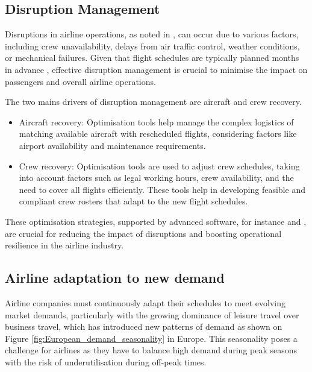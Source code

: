 \subsection{Disruption Management} %
\label{sub:disruption management}

Disruptions in airline operations, as noted in \cite{disruption_management}, can occur due to various factors, including crew unavailability, delays from air traffic control, weather conditions, or mechanical failures. Given that flight schedules are typically planned months in advance \cite{flight_scheduling}, effective disruption management is crucial to minimise the impact on passengers and overall airline operations.

The two mains drivers of disruption management are aircraft and crew recovery.
\begin{itemize}
    \item Aircraft recovery: Optimisation tools help manage the complex logistics of matching available aircraft with rescheduled flights, considering factors like airport availability and maintenance requirements.
    \item Crew recovery: Optimisation tools are used to adjust crew schedules, taking into account factors such as legal working hours, crew availability, and the need to cover all flights efficiently. These tools help in developing feasible and compliant crew rosters that adapt to the new flight schedules.
\end{itemize}

These optimisation strategies, supported by advanced software, for instance \cite{inform_software} and \cite{ibs_software}, are crucial for reducing the impact of disruptions and boosting operational resilience in the airline industry.

\subsection{Airline adaptation to new demand} %
\label{sub:Airline adaptation to new demand}


Airline companies must continuously adapt their schedules to meet evolving market demands, particularly with the growing dominance of leisure travel over business travel, which has introduced new patterns of demand as shown on Figure \ref{fig:European_demand_seasonality} in Europe. This seasonality poses a challenge for airlines as they have to balance high demand during peak seasons with the risk of underutilisation during off-peak times.

